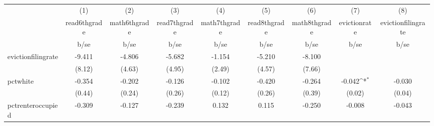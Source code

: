 {
\def\sym#1{\ifmmode^{#1}\else\(^{#1}\)\fi}
\begin{tabular}{l*{8}{c}}
\hline\hline
            &\multicolumn{1}{c}{(1)}           &\multicolumn{1}{c}{(2)}           &\multicolumn{1}{c}{(3)}           &\multicolumn{1}{c}{(4)}           &\multicolumn{1}{c}{(5)}           &\multicolumn{1}{c}{(6)}           &\multicolumn{1}{c}{(7)}           &\multicolumn{1}{c}{(8)}           \\
            &\multicolumn{1}{c}{read6thgrade}  &\multicolumn{1}{c}{math6thgrade}  &\multicolumn{1}{c}{read7thgrade}  &\multicolumn{1}{c}{math7thgrade}  &\multicolumn{1}{c}{read8thgrade}  &\multicolumn{1}{c}{math8thgrade}  &\multicolumn{1}{c}{evictionrate}  &\multicolumn{1}{c}{evictionfilingrate}\\
            &                     b/se         &                     b/se         &                     b/se         &                     b/se         &                     b/se         &                     b/se         &                     b/se         &                     b/se         \\
\hline
evictionfilingrate&                   -9.411         &                   -4.806         &                   -5.682         &                   -1.154         &                   -5.210         &                   -8.100         &                                  &                                  \\
            &                   (8.12)         &                   (4.63)         &                   (4.95)         &                   (2.49)         &                   (4.57)         &                   (7.66)         &                                  &                                  \\
pctwhite    &                   -0.354         &                   -0.202         &                   -0.126         &                   -0.102         &                   -0.420         &                   -0.264         &                   -0.042\sym{*}  &                   -0.030         \\
            &                   (0.44)         &                   (0.24)         &                   (0.26)         &                   (0.12)         &                   (0.26)         &                   (0.39)         &                   (0.02)         &                   (0.04)         \\
pctrenteroccupied&                   -0.309         &                   -0.127         &                   -0.239         &                    0.132         &                    0.115         &                   -0.250         &                   -0.008         &                   -0.043         \\

\end{tabular}}
